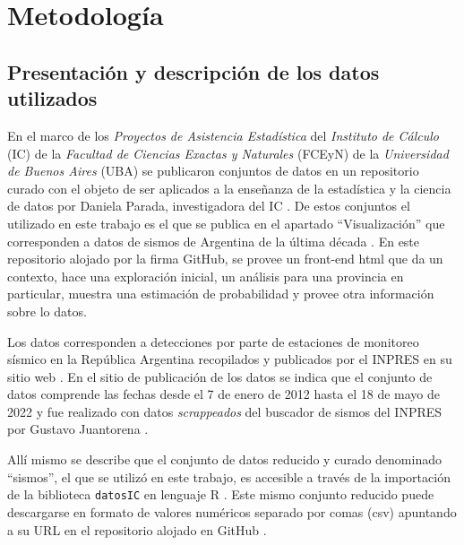\documentclass[a4paper]{report}
\begin{document}




\chapter{Metodología}

\section{Presentación y descripción de los datos utilizados}\label{sec:datos}

En el marco de los \emph{Proyectos de Asistencia Estadística} del \emph{Instituto de Cálculo} (IC) de la \emph{Facultad de Ciencias Exactas y Naturales} (FCEyN) de la \emph{Universidad de Buenos Aires} (UBA) se publicaron conjuntos de datos en un repositorio curado con el objeto de ser aplicados a la enseñanza de la estadística y la ciencia de datos por Daniela Parada, investigadora del IC \cite{noauthor_ic-datasets-docencia_nodate}.
De estos conjuntos el utilizado en este trabajo es el que se publica en el apartado ``Visualización'' que corresponden a datos de sismos de Argentina de la última década \cite{daniela_parada_ic-datasets-docencia_nodate}. 
En este repositorio alojado por la firma GitHub, se provee un front-end html que da un contexto, hace una exploración inicial, un análisis para una provincia en particular, muestra una estimación de probabilidad y provee otra información sobre lo datos.

Los datos corresponden a detecciones por parte de estaciones de monitoreo sísmico en la República Argentina recopilados y publicados por el INPRES en su sitio web \cite{noauthor_buscador_nodate}.
En el sitio de publicación de los datos se indica que el conjunto de datos comprende las fechas desde el 7 de enero de 2012 hasta el 18 de mayo de 2022 y fue realizado con datos \emph{scrappeados} del buscador de sismos del INPRES por Gustavo Juantorena \cite[sección 4.1]{daniela_parada_ic-datasets-docencia_nodate}. 

Allí mismo se describe que el conjunto de datos reducido y curado denominado ``sismos'', el que se utilizó en este trabajo, es accesible a través de la importación de la biblioteca \texttt{datosIC} en lenguaje R \cite[sección 5.1.1]{daniela_parada_ic-datasets-docencia_nodate}.
Este mismo conjunto reducido puede descargarse en formato de valores numéricos separado por comas (csv) apuntando a su URL en el repositorio alojado en GitHub \cite{daniela_parada_sismos-arg_nodate}. 
\end{document}

